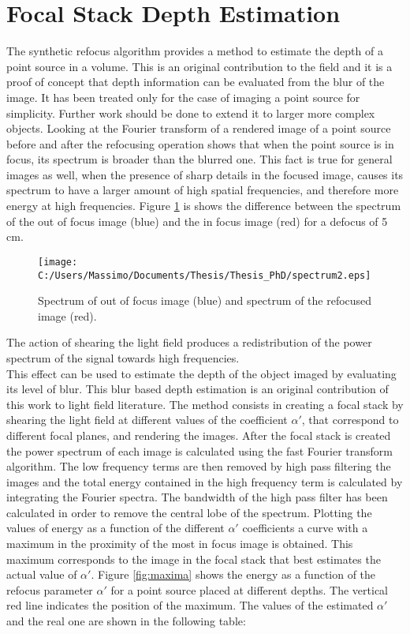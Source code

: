 \section{Focal Stack Depth Estimation} 
The synthetic refocus algorithm provides a method to estimate the depth of a point source in a volume. This is an original contribution to the field and it is a proof of concept that depth information can be evaluated from the blur of the image. It has been treated only for the case of imaging a point source for simplicity. Further work should be done to extend it to larger more complex objects. Looking at the Fourier transform of a rendered image of a point source before and after the refocusing operation shows that when the point source is in focus, its spectrum is broader than the blurred one. This fact is true for general images as well, when the presence of sharp details in the focused image, causes its spectrum to have a larger amount of high spatial frequencies, and therefore more energy at high frequencies. Figure \ref{fig:spec1} is shows the difference between the spectrum of the out of focus image (blue) and the in focus image (red) for a defocus of 5 cm.
\begin{figure}[H]
	\centering
	\texttt{[image: C:/Users/Massimo/Documents/Thesis/Thesis\_PhD/spectrum2.eps]}
	\caption{\label{fig:spec1} Spectrum of out of focus image (blue) and spectrum of the refocused image (red). }
\end{figure}
The action of shearing the light field produces a redistribution of the power spectrum of the signal towards high frequencies. \\
 This effect can be used to estimate the depth of the object imaged by evaluating its level of blur. This blur based depth estimation is an original contribution of this work to light field literature. The method consists in creating a focal stack by shearing the light field at different values of the coefficient $ \alpha'$, that correspond to different focal planes, and rendering the images. After the focal stack is created the power spectrum of each image is calculated using the fast Fourier transform algorithm. The low frequency terms are then removed by high pass filtering the images and the total energy contained in the high frequency term is calculated by integrating the Fourier spectra. The bandwidth of the high pass filter has been calculated in order to remove the central lobe of the spectrum. Plotting the values of energy as a function of the different $ \alpha'$ coefficients a curve with a maximum in the proximity of the most in focus image is obtained. This maximum corresponds to the image in the focal stack that best estimates the actual value of $ \alpha'$. Figure \ref{fig:maxima} shows the energy as a function of the refocus parameter $ \alpha'$ for a point source placed at different depths. The vertical red line indicates the position of the maximum. The values of the estimated $ \alpha'$ and the real one are shown in the following table:
